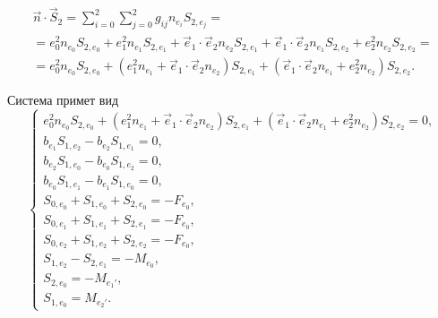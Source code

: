 \begin{multline*}
	\vec n \cdot \vec S_2 = \sum\limits_{i=0}^{2}\sum\limits_{j=0}^{2} g_{ij} n_{e_i} S_{2,e_j} =\\=
	e_0^2 n_{e_0} S_{2,{e_0}} +
	e_1^2 n_{e_1} S_{2,{e_1}} +
	\vec e_1 \cdot \vec e_2 n_{e_2} S_{2,{e_1}} +
	\vec e_1 \cdot \vec e_2 n_{e_1} S_{2,{e_2}} +
	e_2^2 n_{e_2} S_{2,e_2}
	= \\ =
	e_0^2 n_{e_0} S_{2,{e_0}} +
	\left( e_1^2 n_{e_1} + \vec e_1 \cdot \vec e_2 n_{e_2} \right) S_{2,{e_1}} +
	\left( \vec e_1 \cdot \vec e_2 n_{e_1} + e_2^2 n_{e_2} \right) S_{2,{e_2}}.
\end{multline*}

Система примет вид
\begin{equation}
\left\{\begin{array}{l}
	e_0^2 n_{e_0} S_{2,{e_0}} +
	\left( e_1^2 n_{e_1} + \vec e_1 \cdot \vec e_2 n_{e_2} \right) S_{2,{e_1}} +
	\left( \vec e_1 \cdot \vec e_2 n_{e_1} + e_2^2 n_{e_2} \right) S_{2,{e_2}} = 0, \\

	b_{e_1} S_{1,{e_2}} - b_{e_2} S_{1,{e_1}} = 0, \\
	b_{e_2} S_{1,{e_0}} - b_{e_0} S_{1,{e_2}} = 0, \\
	b_{e_0} S_{1,{e_1}} - b_{e_1} S_{1,{e_0}} = 0, \\

	S_{0,{e_0}} + S_{1,{e_0}} + S_{2,{e_0}} = - F_{e_0},\\
	S_{0,{e_1}} + S_{1,{e_1}} + S_{2,{e_1}} = - F_{e_0},\\
	S_{0,{e_2}} + S_{1,{e_2}} + S_{2,{e_2}} = - F_{e_0},\\

	S_{1,{e_2}} -  S_{2,{e_1}} = - M_{e_0},\\
	S_{2,{e_0}} = -M_{e_1'},\\
	S_{1,{e_0}} = M_{e_2'}.
\end{array}\right.
\end{equation}


